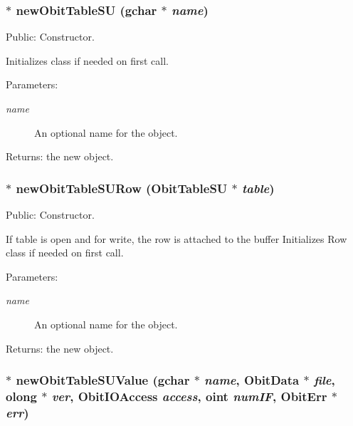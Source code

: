 \subsubsection{$\ast$ new\-Obit\-Table\-SU (gchar $\ast$ {\em name})}\label{ObitTableSU_8c_a16}


Public: Constructor. 

Initializes class if needed on first call. \begin{Desc}
\item[Parameters:]
\begin{description}
\item[{\em name}]An optional name for the object. \end{description}
\end{Desc}
\begin{Desc}
\item[Returns:]the new object. \end{Desc}
\subsubsection{$\ast$ new\-Obit\-Table\-SURow ({\bf Obit\-Table\-SU} $\ast$ {\em table})}\label{ObitTableSU_8c_a14}


Public: Constructor. 

If table is open and for write, the row is attached to the buffer Initializes Row class if needed on first call. \begin{Desc}
\item[Parameters:]
\begin{description}
\item[{\em name}]An optional name for the object. \end{description}
\end{Desc}
\begin{Desc}
\item[Returns:]the new object. \end{Desc}
\subsubsection{$\ast$ new\-Obit\-Table\-SUValue (gchar $\ast$ {\em name}, {\bf Obit\-Data} $\ast$ {\em file}, {\bf olong} $\ast$ {\em ver}, Obit\-IOAccess {\em access}, {\bf oint} {\em num\-IF}, {\bf Obit\-Err} $\ast$ {\em err})}\label{ObitTableSU_8c_a18}


